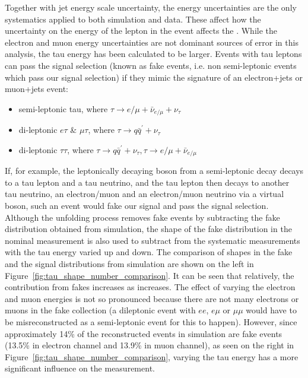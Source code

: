 Together with jet energy scale uncertainty, the \met energy uncertainties are the only systematics applied to
both simulation and data. These affect how the uncertainty on the energy of the lepton in the event affects
the \met. While the electron and muon energy uncertainties are not dominant sources of error in this analysis,
the tau energy has been calculated to be larger. Events with tau leptons can pass the signal selection (known
as fake events, i.e. non semi-leptonic \ttbar events which pass our signal selection) if they mimic the
signature of an electron+jets or muon+jets \ttbar event:

\begin{itemize}
 \item semi-leptonic tau, where $\tau \rightarrow e/\mu + \bar{\nu}_{e/\mu} + \nu_{\tau}$
 \item di-leptonic $e\tau$ \& $\mu\tau$, where $\tau \rightarrow q\bar{q}^{'} + \nu_\tau$
 \item di-leptonic $\tau\tau$, where $\tau \rightarrow q\bar{q}^{'} + \nu_\tau, \tau \rightarrow e/\mu
 + \bar{\nu}_{e/\mu}$
\end{itemize}

If, for example, the leptonically decaying \W boson from a semi-leptonic \ttbar decay decays to a tau lepton
and a tau neutrino, and the tau lepton then decays to another tau neutrino, an electron/muon and an
electron/muon neutrino via a virtual \W boson, such an event would fake our signal and pass the \ttbar signal
selection. Although the unfolding process removes fake events by subtracting the fake distribution obtained
from simulation, the shape of the fake distribution in the nominal measurement is also used to subtract from
the systematic measurements with the tau energy varied up and down. The comparison of shapes in the fake and
the signal distributions from \ttbar simulation are shown on the left in
Figure~\ref{fig:tau_shape_number_comparison}. It can be seen that relatively, the contribution from fakes
increases as \met increases. The effect of varying the electron and muon energies is not so pronounced because
there are not many electrons or muons in the fake collection (a dileptonic \ttbar event with $ee$, $e\mu$ or
$\mu\mu$ would have to be misreconstructed as a semi-leptonic event for this to happen). However, since
approximately 14\% of the reconstructed \ttbar events in simulation are fake events (13.5\% in electron
channel and 13.9\% in muon channel), as seen on the right in Figure~\ref{fig:tau_shape_number_comparison},
varying the tau energy has a more significant influence on the measurement.

